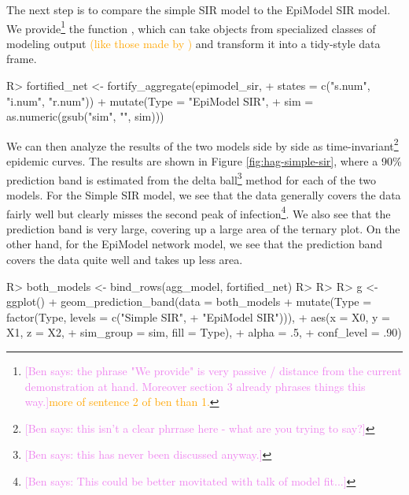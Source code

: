 \documentclass[
  shortnames]{jss}
\begin{document}
The next step is to compare the simple SIR model to the EpiModel SIR
model. We
provide\footnote{\textcolor{violet}{[Ben says: the phrase "We provide" is very passive / distance from the current demonstration at hand. Moreover section 3 already phrases things this way.]}\textcolor{orange}{more of sentence 2 of ben than 1.}}
the function , which can take objects from
specialized classes of modeling output
\textcolor{orange}{(like those made by )} and transform
it into a tidy-style data frame.

\begin{CodeChunk}
\begin{CodeInput}
R> fortified_net <- fortify_aggregate(epimodel_sir, 
+                                    states = c("s.num", "i.num", "r.num")) %
+   mutate(Type = "EpiModel SIR",
+          sim = as.numeric(gsub("sim", "", sim)))
\end{CodeInput}
\end{CodeChunk}

We can then analyze the results of the two models side by side as
time-invariant\footnote{\textcolor{violet}{[Ben says: this isn't a clear phrrase here - what are you trying to say?]}}
epidemic curves. The results are shown in Figure
\ref{fig:hag-simple-sir}, where a 90\% prediction band is estimated from
the delta
ball\footnote{\textcolor{violet}{[Ben says: this has never been discussed anyway.]}}
method for each of the two models. For the Simple SIR model, we see that
the data generally covers the data fairly well but clearly misses the
second peak of
infection\footnote{\textcolor{violet}{[Ben says: This could be better movitated with talk of model fit...]}}.
We also see that the prediction band is very large, covering up a large
area of the ternary plot. On the other hand, for the EpiModel network
model, we see that the prediction band covers the data quite well and
takes up less area.

\begin{CodeChunk}
\begin{CodeInput}
R> both_models <- bind_rows(agg_model, fortified_net)
R> 
R> 
R> g <- ggplot() + geom_prediction_band(data = both_models %
+                   mutate(Type = factor(Type, levels = c("Simple SIR", 
+                                                         "EpiModel SIR"))),
+          aes(x = X0, y = X1, z = X2,
+               sim_group = sim, fill = Type),
+          alpha = .5,
+          conf_level = .90) 
\end{CodeInput}
\end{CodeChunk}
\end{document}
